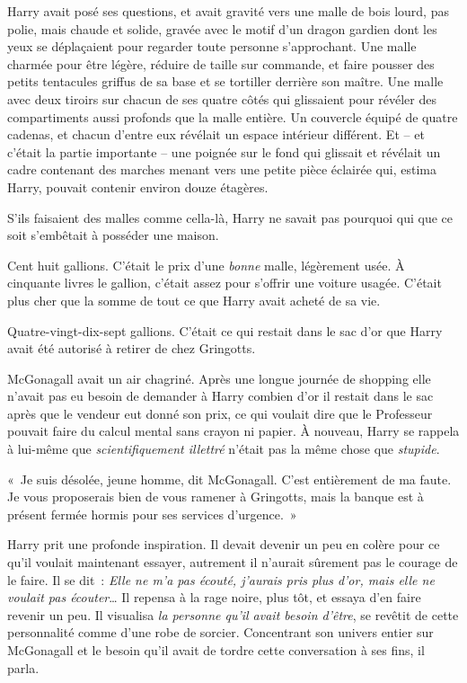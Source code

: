 Harry avait posé ses questions, et avait gravité vers une malle de bois lourd, pas polie, mais chaude et solide, gravée avec le motif d'un dragon gardien dont les yeux se déplaçaient pour regarder toute personne s'approchant. Une malle charmée pour être légère, réduire de taille sur commande, et faire pousser des petits tentacules griffus de sa base et se tortiller derrière son maître. Une malle avec deux tiroirs sur chacun de ses quatre côtés qui glissaient pour révéler des compartiments aussi profonds que la malle entière. Un couvercle équipé de quatre cadenas, et chacun d'entre eux révélait un espace intérieur différent. Et -- et c'était la partie importante -- une poignée sur le fond qui glissait et révélait un cadre contenant des marches menant vers une petite pièce éclairée qui, estima Harry, pouvait contenir environ douze étagères.

S'ils faisaient des malles comme cella-là, Harry ne savait pas pourquoi qui que ce soit s'embêtait à posséder une maison.

Cent huit gallions. C'était le prix d'une \emph{bonne} malle, légèrement usée. À cinquante livres le gallion, c'était assez pour s'offrir une voiture usagée. C'était plus cher que la somme de tout ce que Harry avait acheté de sa vie.

Quatre-vingt-dix-sept gallions. C'était ce qui restait dans le sac d'or que Harry avait été autorisé à retirer de chez Gringotts.

McGonagall avait un air chagriné. Après une longue journée de shopping elle n'avait pas eu besoin de demander à Harry combien d'or il restait dans le sac après que le vendeur eut donné son prix, ce qui voulait dire que le Professeur pouvait faire du calcul mental sans crayon ni papier. À nouveau, Harry se rappela à lui-même que \emph{scientifiquement illettré} n'était pas la même chose que \emph{stupide}.

«~Je suis désolée, jeune homme, dit McGonagall. C'est entièrement de ma faute. Je vous proposerais bien de vous ramener à Gringotts, mais la banque est à présent fermée hormis pour ses services d'urgence.~»

Harry prit une profonde inspiration. Il devait devenir un peu en colère pour ce qu'il voulait maintenant essayer, autrement il n'aurait sûrement pas le courage de le faire. Il se dit~: \emph{Elle ne m'a pas écouté, j'aurais pris plus d'or, mais elle ne voulait pas écouter}… Il repensa à la rage noire, plus tôt, et essaya d'en faire revenir un peu. Il visualisa \emph{la personne qu'il avait besoin d'être}, se revêtit de cette personnalité comme d'une robe de sorcier. Concentrant son univers entier sur McGonagall et le besoin qu'il avait de tordre cette conversation à ses fins, il parla.

